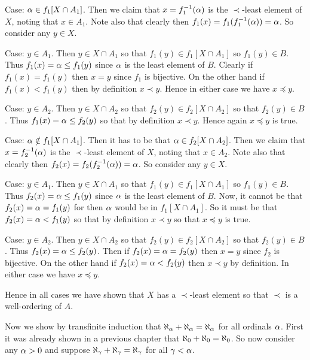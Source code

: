 {{    Case: $\alpha \in f_1[X \cap A_1]$.
    Then we claim that $x = f_1^{-1}(\alpha)$ is the $\prec$-least element of $X$, noting that $x \in A_1$.
    Note also that clearly then $f_1(x) = f_1(f_1^{-1}(\alpha)) = \alpha$.
    So consider any $y \in X$.
    \begin{indpar}
      Case: $y \in A_1$.
      Then $y \in X \cap A_1$ so that $f_1(y) \in f_1[X \cap A_1]$ so $f_1(y) \in B$.
      Thus $f_1(x) = \alpha \leq f_1(y)$ since $\alpha$ is the least element of $B$.
      Clearly if $f_1(x) = f_1(y)$ then $x = y$ since $f_1$ is bijective.
      On the other hand if $f_1(x) < f_1(y)$ then by definition $x \prec y$.
      Hence in either case we have $x \preceq y$.

      Case: $y \in A_2$.
      Then $y \in X \cap A_2$ so that $f_2(y) \in f_2[X \cap A_2]$ so that $f_2(y) \in B$.
      Thus $f_1(x) = \alpha \leq f_2(y)$ so that by definition $x \prec y$.
      Hence again $x \preceq y$ is true.
    \end{indpar}

    Case: $\alpha \notin f_1[X \cap A_1]$.
    Then it has to be that $\alpha \in f_2[X \cap A_2]$.
    Then we claim that $x = f_2^{-1}(\alpha)$ is the $\prec$-least element of $X$, noting that $x \in A_2$.
    Note also that clearly then $f_2(x) = f_2(f_2^{-1}(\alpha)) = \alpha$.
    So consider any $y \in X$.
    \begin{indpar}
      Case: $y \in A_1$.
      Then $y \in X \cap A_1$ so that $f_1(y) \in f_1[X \cap A_1]$ so $f_1(y) \in B$.
      Thus $f_2(x) = \alpha \leq f_1(y)$ since $\alpha$ is the least element of $B$.
      Now, it cannot be that $f_2(x) = \alpha = f_1(y)$ for then $\alpha$ would be in $f_1[X \cap A_1]$.
      So it must be that $f_2(x) = \alpha < f_1(y)$ so that by definition $x \prec y$ so that $x \preceq y$ is true.

      Case: $y \in A_2$.
      Then $y \in X \cap A_2$ so that $f_2(y) \in f_2[X \cap A_2]$ so that $f_2(y) \in B$.
      Thus $f_2(x) = \alpha \leq f_2(y)$.
      Then if $f_2(x) = \alpha = f_2(y)$ then $x = y$ since $f_2$ is bijective.
      On the other hand if $f_2(x) = \alpha < f_2(y)$ then $x \prec y$ by definition.
      In either case we have $x \preceq y$.
    \end{indpar}
    Hence in all cases we have shown that $X$ has a $\prec$-least element so that $\prec$ is a well-ordering of $A$.

    Now we show by transfinite induction that $\aleph_\alpha + \aleph_\alpha = \aleph_\alpha$ for all ordinals $\alpha$.
    First it was already shown in a previous chapter that $\aleph_0 + \aleph_0 = \aleph_0$.
    So now consider any $\alpha > 0$ and suppose $\aleph_\gamma + \aleph_\gamma = \aleph_\gamma$ for all $\gamma < \alpha$.

}}
